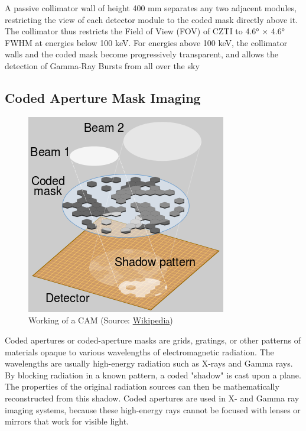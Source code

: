 \documentclass[11pt]{book} %
\begin{document}
A passive collimator wall of height 400 mm separates any two adjacent modules, restricting the view
of each detector module to the coded mask directly
above it. The collimator thus restricts the Field of View
(FOV) of CZTI to 4.6° × 4.6° FWHM at energies below
100 keV. For energies above 100 keV, the collimator
walls and the coded mask become progressively transparent, and allows the detection of Gamma-Ray Bursts
from all over the sky

\clearpage


\subsection{Coded Aperture Mask Imaging}


\begin{figure}
    \centering
    \includegraphics[scale=0.53]{Pictures/cam_working.png}
\caption{Working of a CAM (Source: \href{https://en.wikipedia.org/wiki/Coded_aperture}{Wikipedia})}
\end{figure}


Coded apertures or coded-aperture masks are grids, gratings, or other patterns of materials opaque to various wavelengths of electromagnetic radiation. The wavelengths are usually high-energy radiation such as X-rays and Gamma rays. By blocking radiation in a known pattern, a coded "shadow" is cast upon a plane. The properties of the original radiation sources can then be mathematically reconstructed from this shadow. Coded apertures are used in X- and Gamma ray imaging systems, because these high-energy rays cannot be focused with lenses or mirrors that work for visible light. 
\end{document}
